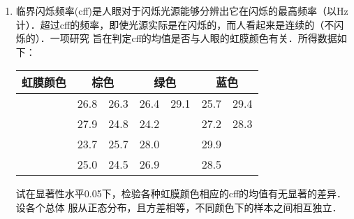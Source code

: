 \documentclass[10pt,a4paper]{article}
\begin{document}
\begin{enumerate}
    \item 临界闪烁频率(cff)是人眼对于闪烁光源能够分辨出它在闪烁的最高频率（以Hz
    计）．超过cff的频率，即使光源实际是在闪烁的，而人看起来是连续的（不闪烁的）．一项研究
    旨在判定cff的均值是否与人眼的虹膜颜色有关．所得数据如下：
    \renewcommand{\arraystretch}{1.3}
    \begin{table}[H]\centering
        \begin{tabular}{ccccccc}
        \hline
        虹膜颜色                 & \multicolumn{2}{c}{棕色}                              & \multicolumn{2}{c}{绿色}                          & \multicolumn{2}{c}{蓝色}                         \\ \hline
                             & 26.8                     & 26.3                     & 26.4                     & 29.1                 & 25.7                     & 29.4                 \\
                             & 27.9                     & 24.8                     & 24.2                     &                      & 27.2                     & 28.3                 \\
        \multicolumn{1}{l}{} & \multicolumn{1}{l}{23.7} & \multicolumn{1}{l}{25.7} & \multicolumn{1}{l}{28.0} & \multicolumn{1}{l}{} & \multicolumn{1}{l}{29.9} & \multicolumn{1}{l}{} \\
                             & 25.0                     & 24.5                     & 26.9                     &                      & 28.5                     &                      \\ \hline
        \end{tabular}
    \end{table}
    \renewcommand{\arraystretch}{1.0}
    试在显著性水平0.05下，检验各种虹膜颜色相应的cff的均值有无显著的差异．设各个总体
    服从正态分布，且方差相等，不同颜色下的样本之间相互独立．





\end{enumerate}
\end{document}
